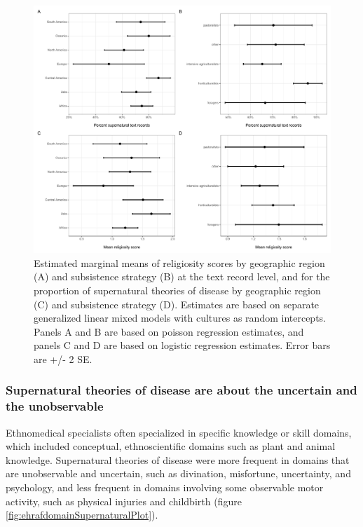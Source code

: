 \documentclass[
  11pt,
]{article}
\begin{document}
\begin{landscape}
\begin{figure}[p]

{\centering \includegraphics{magic-healers-article2_files/figure-latex/ehrafRegionSub-1} 

}

\caption{Estimated marginal means of religiosity scores by geographic region (A) and subsistence strategy (B) at the text record level, and for the proportion of supernatural theories of disease by geographic region (C) and subsistence strategy (D). Estimates are based on separate generalized linear mixed models with cultures as random intercepts. Panels A and B are based on poisson regression estimates, and panels C and D are based on logistic regression estimates. Error bars are +/- 2 SE.}\label{fig:ehrafRegionSub}
\end{figure}

\end{landscape}

\hypertarget{supernatural-theories-of-disease-are-about-the-uncertain-and-the-unobservable}{%
\subsubsection{Supernatural theories of disease are about the uncertain and the unobservable}\label{supernatural-theories-of-disease-are-about-the-uncertain-and-the-unobservable}}

Ethnomedical specialists often specialized in specific knowledge or skill domains, which included conceptual, ethnoscientific domains such as plant and animal knowledge. Supernatural theories of disease were more frequent in domains that are unobservable and uncertain, such as divination, misfortune, uncertainty, and psychology, and less frequent in domains involving some observable motor activity, such as physical injuries and childbirth (figure \ref{fig:ehrafdomainSupernaturalPlot}).
\end{document}
